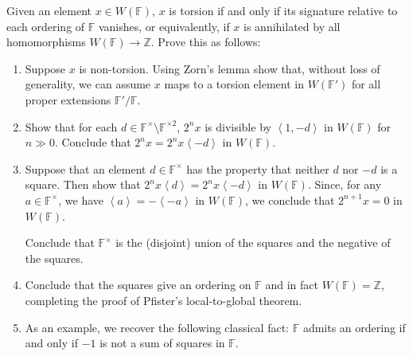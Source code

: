 \documentclass[12 pt, letterpaper]{hmcpset}
\begin{document}
\pagebreak

\begin{problem}
	Given an element $x \in W(\mathbb{F})$, $x$ is torsion if and only if its signature relative to each ordering of $\mathbb{F}$ vanishes, or equivalently, if $x$ is annihilated by all homomorphisms $W(\mathbb{F}) \to \mathbb{Z}$. Prove this as follows:
	\begin{enumerate}
		\item Suppose $x$ is non-torsion. Using Zorn's lemma show that, without loss of generality, we can assume $x$ maps to a torsion element in $W(\mathbb{F}')$ for all proper extensions $\mathbb{F}' / \mathbb{F}$.

		\item Show that for each $d \in \mathbb{F}^{\times} \setminus \mathbb{F}^{\times 2}$, $2^{n} x$ is divisible by $\left < 1, -d \right >$ in $W(\mathbb{F})$ for $n \gg 0$. Conclude that $2^{n} x = 2^{n} x \left < -d \right >$ in $W(\mathbb{F})$.

		\item Suppose that an element $d \in \mathbb{F}^{\times}$ has the property that neither $d$ nor $-d$ is a square. Then show that $2^{n} x \left < d \right > = 2^{n} x \left < -d \right >$ in $W(\mathbb{F})$. Since, for any $a \in \mathbb{F}^{\times}$, we have $\left < a \right > = - \left < - a \right >$ in $W(\mathbb{F})$, we conclude that $2^{n + 1} x = 0$ in $W(\mathbb{F})$.

			Conclude that $\mathbb{F}^{\times}$ is the (disjoint) union of the squares and the negative of the squares.

		\item Conclude that the squares give an ordering on $\mathbb{F}$ and in fact $W(\mathbb{F}) = \mathbb{Z}$, completing the proof of Pfister's local-to-global theorem.

		\item As an example, we recover the following classical fact:  $\mathbb{F}$ admits an ordering if and only if $-1$ is not a sum of squares in $\mathbb{F}$.
	\end{enumerate}
\end{problem}
\end{document}
